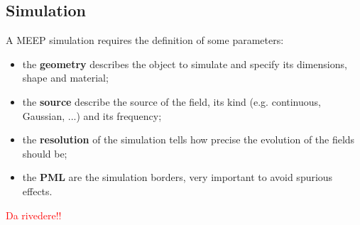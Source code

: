 \subsection{Simulation}

A MEEP simulation requires the definition of some parameters:
\begin{itemize}
    \item the \textbf{geometry} describes the object to simulate and specify its dimensions, shape and material;
    \item the \textbf{source} describe the source of the field, its kind (e.g. continuous, Gaussian, ...) and its frequency;
    \item the \textbf{resolution} of the simulation tells how precise the evolution of the fields should be;
    \item the \textbf{PML} are the simulation borders, very important to avoid spurious effects.
\end{itemize}

\textcolor{red}{Da rivedere!!}